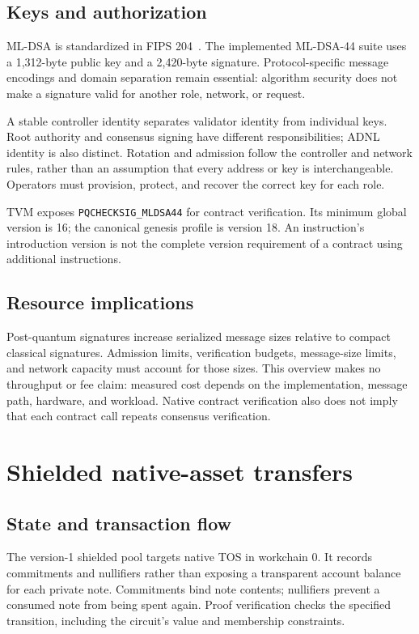 \documentclass[11pt,a4paper]{article}
\newcommand{\code}[1]{\texttt{#1}}
\begin{document}
\subsection{Keys and authorization}
ML-DSA is standardized in FIPS 204~\cite{fips204}. The implemented ML-DSA-44
suite uses a 1,312-byte public key and a 2,420-byte signature. Protocol-specific
message encodings and domain separation remain essential: algorithm security
does not make a signature valid for another role, network, or request.

A stable controller identity separates validator identity from individual
keys. Root authority and consensus signing have different responsibilities;
ADNL identity is also distinct. Rotation and admission follow the controller
and network rules, rather than an assumption that every address or key is
interchangeable. Operators must provision, protect, and recover the correct
key for each role.

TVM exposes \code{PQCHECKSIG\_MLDSA44} for contract verification. Its minimum
global version is 16; the canonical genesis profile is version 18. An
instruction's introduction version is not the complete version requirement
of a contract using additional instructions.

\subsection{Resource implications}
Post-quantum signatures increase serialized message sizes relative to compact
classical signatures. Admission limits, verification budgets, message-size
limits, and network capacity must account for those sizes. This overview
makes no throughput or fee claim: measured cost depends on the implementation,
message path, hardware, and workload. Native contract verification also does
not imply that each contract call repeats consensus verification.

\section{Shielded native-asset transfers}
\subsection{State and transaction flow}
The version-1 shielded pool targets native TOS in workchain 0. It records
commitments and nullifiers rather than exposing a transparent account balance
for each private note. Commitments bind note contents; nullifiers prevent a
consumed note from being spent again. Proof verification checks the specified
transition, including the circuit's value and membership constraints.
\end{document}
